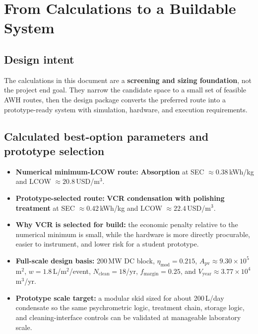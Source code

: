 \documentclass[11pt,a4paper]{article}
\begin{document}
\section{From Calculations to a Buildable System}
\subsection{Design intent}
The calculations in this document are a \textbf{screening and sizing foundation}, not the project end goal. They narrow the candidate space to a small set of feasible AWH routes, then the design package converts the preferred route into a prototype-ready system with simulation, hardware, and execution requirements.

\subsection{Calculated best-option parameters and prototype selection}
\begin{itemize}[leftmargin=*]
  \item \textbf{Numerical minimum-LCOW route:} \textbf{Absorption} at SEC $\approx 0.38$\,kWh/kg and LCOW $\approx 20.8$\,USD/m$^3$.
  \item \textbf{Prototype-selected route:} \textbf{VCR condensation with polishing treatment} at SEC $\approx 0.42$\,kWh/kg and LCOW $\approx 22.4$\,USD/m$^3$.
  \item \textbf{Why VCR is selected for build:} the economic penalty relative to the numerical minimum is small, while the hardware is more directly procurable, easier to instrument, and lower risk for a student prototype.
  \item \textbf{Full-scale design basis:} 200\,MW DC block, $\eta_{\mathrm{mod}}=0.215$, $A_{\mathrm{pv}}\approx 9.30\times 10^5$\,m$^2$, $w=1.8$\,L/m$^2$/event, $N_{\mathrm{clean}}=18$/yr, $f_{\mathrm{margin}}=0.25$, and $V_{\mathrm{year}}\approx 3.77\times 10^4$\,m$^3$/yr.
  \item \textbf{Prototype scale target:} a modular skid sized for about 200\,L/day condensate so the same psychrometric logic, treatment chain, storage logic, and cleaning-interface controls can be validated at manageable laboratory scale.
\end{itemize}
\end{document}
